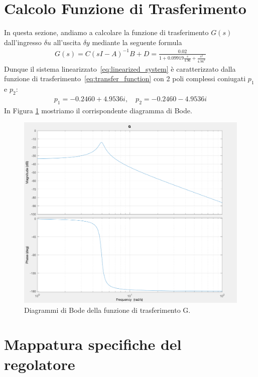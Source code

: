 \documentclass[a4paper, 11pt]{article}
\begin{document}
\section{Calcolo Funzione di Trasferimento}

In questa sezione, andiamo a calcolare la funzione di trasferimento $G(s)$ dall'ingresso $\delta u$ all'uscita $\delta y$ mediante la seguente formula 
%
%
\begin{align}\label{eq:transfer_function}
	G(s) = C(sI-A)^{-1}B + D = \frac{0.02}{1+0.09919\frac{s}{4.96}+\frac{s^2}{4.96^2}}
\end{align}
%
Dunque il sistema linearizzato~\eqref{eq:linearized_system} è caratterizzato dalla funzione di trasferimento~\eqref{eq:transfer_function} con 2 poli complessi coniugati $p_1$ e $p_2$:
\begin{align}
	p_1 = -0.2460 + 4.9536i, \quad p_2 = -0.2460 - 4.9536i
\end{align}
In Figura \ref{fig:G_bode} mostriamo il corrispondente diagramma di Bode. 

\begin{figure}[h!]
	\centering
	\includegraphics[width=0.75\linewidth]{./images/bode_G.png}
	\caption{Diagrammi di Bode della funzione di trasferimento G.}
	\label{fig:G_bode}
\end{figure}

\section{Mappatura specifiche del regolatore}
\label{sec:specifications}
\end{document}
